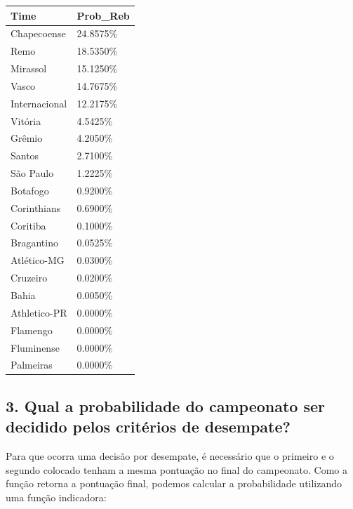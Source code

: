 \documentclass[11pt,]{article}
\newenvironment{Shaded}{\begin{snugshade}}{\end{snugshade}}
\newcommand{\AttributeTok}[1]{\textcolor[rgb]{0.13,0.29,0.53}{#1}}
\newcommand{\ControlFlowTok}[1]{\textcolor[rgb]{0.13,0.29,0.53}{\textbf{#1}}}
\newcommand{\DecValTok}[1]{\textcolor[rgb]{0.00,0.00,0.81}{#1}}
\newcommand{\FloatTok}[1]{\textcolor[rgb]{0.00,0.00,0.81}{#1}}
\newcommand{\FunctionTok}[1]{\textcolor[rgb]{0.13,0.29,0.53}{\textbf{#1}}}
\newcommand{\NormalTok}[1]{#1}
\newcommand{\SpecialCharTok}[1]{\textcolor[rgb]{0.81,0.36,0.00}{\textbf{#1}}}
\begin{document}
\begin{longtable}[]{@{}ll@{}}
\toprule\noalign{}
Time & Prob\_Reb \\
\midrule\noalign{}
\endhead
\bottomrule\noalign{}
\endlastfoot
Chapecoense & 24.8575\% \\
Remo & 18.5350\% \\
Mirassol & 15.1250\% \\
Vasco & 14.7675\% \\
Internacional & 12.2175\% \\
Vitória & 4.5425\% \\
Grêmio & 4.2050\% \\
Santos & 2.7100\% \\
São Paulo & 1.2225\% \\
Botafogo & 0.9200\% \\
Corinthians & 0.6900\% \\
Coritiba & 0.1000\% \\
Bragantino & 0.0525\% \\
Atlético-MG & 0.0300\% \\
Cruzeiro & 0.0200\% \\
Bahia & 0.0050\% \\
Athletico-PR & 0.0000\% \\
Flamengo & 0.0000\% \\
Fluminense & 0.0000\% \\
Palmeiras & 0.0000\% \\
\end{longtable}

\newpage

\hypertarget{qual-a-probabilidade-do-campeonato-ser-decidido-pelos-crituxe9rios-de-desempate}{%
\subsection{3. Qual a probabilidade do campeonato ser decidido pelos
critérios de
desempate?}\label{qual-a-probabilidade-do-campeonato-ser-decidido-pelos-crituxe9rios-de-desempate}}

Para que ocorra uma decisão por desempate, é necessário que o primeiro e
o segundo colocado tenham a mesma pontuação no final do campeonato. Como
a função retorna a pontuação final, podemos calcular a probabilidade
utilizando uma função indicadora:

\begin{Shaded}
\end{Shaded}
\end{document}
